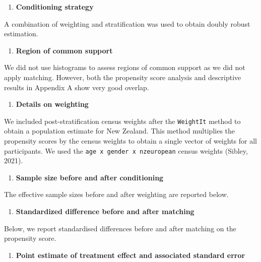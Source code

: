 \documentclass[
  singlecolumn,
  9pt]{scrartcl}
\providecommand{\tightlist}{%
  \setlength{\itemsep}{0pt}\setlength{\parskip}{0pt}}\usepackage{longtable,booktabs,array}
\begin{document}
\begin{enumerate}
\def\labelenumi{\arabic{enumi}.}
\setcounter{enumi}{4}
\tightlist
\item
  \textbf{Conditioning strategy}
\end{enumerate}

A combination of weighting and stratification was used to obtain doubly
robust estimation.

\begin{enumerate}
\def\labelenumi{\arabic{enumi}.}
\setcounter{enumi}{5}
\tightlist
\item
  \textbf{Region of common support}
\end{enumerate}

We did not use histograms to assess regions of common support as we did
not apply matching. However, both the propensity score analysis and
descriptive results in Appendix A show very good overlap.

\begin{enumerate}
\def\labelenumi{\arabic{enumi}.}
\setcounter{enumi}{6}
\tightlist
\item
  \textbf{Details on weighting}
\end{enumerate}

We included post-stratification census weights after the
\texttt{WeightIt} method to obtain a population estimate for New
Zealand. This method multiplies the propensity scores by the census
weights to obtain a single vector of weights for all participants. We
used the \texttt{age\ x\ gender\ x\ nzeuropean} census weights (Sibley,
2021).

\begin{enumerate}
\def\labelenumi{\arabic{enumi}.}
\setcounter{enumi}{7}
\tightlist
\item
  \textbf{Sample size before and after conditioning}
\end{enumerate}

The effective sample sizes before and after weighting are reported
below.

\begin{enumerate}
\def\labelenumi{\arabic{enumi}.}
\setcounter{enumi}{8}
\tightlist
\item
  \textbf{Standardized difference before and after matching}
\end{enumerate}

Below, we report standardised differences before and after matching on
the propensity score.

\begin{enumerate}
\def\labelenumi{\arabic{enumi}.}
\setcounter{enumi}{9}
\tightlist
\item
  \textbf{Point estimate of treatment effect and associated standard
  error}
\end{enumerate}
\end{document}
